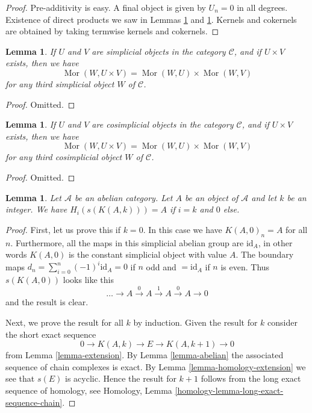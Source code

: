 \documentclass{stacks-project}
\theoremstyle{plain}
\newtheorem{lemma}[subsection]{Lemma}
\theoremstyle{definition}
\theoremstyle{remark}
\numberwithin{equation}{subsection}
\def\Mor{\mathop{\mathrm{Mor}}\nolimits}
\begin{document}
\begin{proof}
Pre-additivity is easy. A final object is
given by $U_n = 0$ in all degrees.
Existence of direct products we saw in
Lemmas \ref{lemma-product} and
\ref{lemma-product-cosimplicial-objects}.
Kernels and cokernels are obtained by taking
termwise kernels and cokernels.
\end{proof}

\begin{lemma}
\label{lemma-product}
If $U$ and $V$ are simplicial objects in the category $\mathcal{C}$,
and if $U \times V$ exists, then we have
$$
\Mor(W, U \times V) =
\Mor(W, U) \times
\Mor(W, V)
$$
for any third simplicial object $W$ of $\mathcal{C}$.
\end{lemma}

\begin{proof}
Omitted.
\end{proof}

\begin{lemma}
\label{lemma-product-cosimplicial-objects}
If $U$ and $V$ are cosimplicial objects in the category $\mathcal{C}$,
and if $U \times V$ exists, then we have
$$
\Mor(W, U \times V) =
\Mor(W, U) \times
\Mor(W, V)
$$
for any third cosimplicial object $W$ of $\mathcal{C}$.
\end{lemma}

\begin{proof}
Omitted.
\end{proof}

\begin{lemma}
\label{lemma-homology-eilenberg-maclane}
Let $\mathcal{A}$ be an abelian category.
Let $A$ be an object of $\mathcal{A}$ and
let $k$ be an integer. We have
$H_i(s(K(A, k))) = A$ if $i = k$ and
$0$ else.
\end{lemma}

\begin{proof}
First, let us prove this if $k = 0$.
In this case we have $K(A, 0)_n = A$ for all $n$.
Furthermore, all the maps in this simplicial abelian
group are $\text{id}_A$, in other words $K(A, 0)$
is the constant simplicial object with value $A$.
The boundary maps $d_n = \sum_{i = 0}^n (-1)^i \text{id}_A
= 0$ if $n$ odd and $ = \text{id}_A$ if $n$ is even.
Thus $s(K(A, 0))$ looks like this
$$
\ldots \to A \xrightarrow{0} A \xrightarrow{1} A \xrightarrow{0} A \to 0
$$
and the result is clear.

\medskip\noindent
Next, we prove the result for all $k$ by induction.
Given the result for $k$ consider the short exact sequence
$$
0 \to K(A, k) \to E \to K(A, k + 1) \to 0
$$
from Lemma \ref{lemma-extension}.
By Lemma \ref{lemma-abelian} the associated sequence of
chain complexes is exact.
By Lemma \ref{lemma-homology-extension} we see that
$s(E)$ is acyclic. Hence the result for $k + 1$
follows from the long exact sequence of homology,
see Homology, Lemma \ref{homology-lemma-long-exact-sequence-chain}.
\end{proof}
\end{document}
